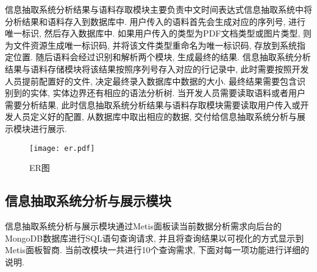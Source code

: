 信息抽取系统分析结果与语料存取模块主要负责中文时间表达式信息抽取系统中将分析结果和语料存入到数据库中.
用户传入的语料首先会生成对应的序列号, 进行唯一标识, 然后存入数据库中.
如果用户传入的类型为PDF文档类型或图片类型, 则为文件资源生成唯一标识码, 并将该文件类型重命名为唯一标识码, 存放到系统指定位置.
随后语料会经过识别和解析两个模块, 生成最终的结果.
信息抽取系统分析结果与语料存储模块将该结果按照序列号存入对应的行记录中, 此时需要按照开发人员提前配置好的文件, 决定最终录入数据库中数据的大小.
最终结果需要包含识别到的实体, 实体边界还有相应的语法分析树.
当开发人员需要读取语料或者用户需要分析结果, 此时信息抽取系统分析结果与语料存取模块需要读取用户传入或开发人员定义好的配置, 从数据库中取出相应的数据,
交付给信息抽取系统分析与展示模块进行展示.

\begin{figure}[h]
  \centering
  \texttt{[image: er.pdf]}
  \caption{ER图}
  \label{fig:er_graph}
\end{figure}

\subsection{信息抽取系统分析与展示模块}

信息抽取系统分析与展示模块通过Metis面板读当前数据分析需求向后台的MongoDB数据库进行SQL语句查询请求, 并且将查询结果以可视化的方式显示到Metis面板智商.
当前改模块一共进行10个查询需求, 下面对每一项功能进行详细的说明.

